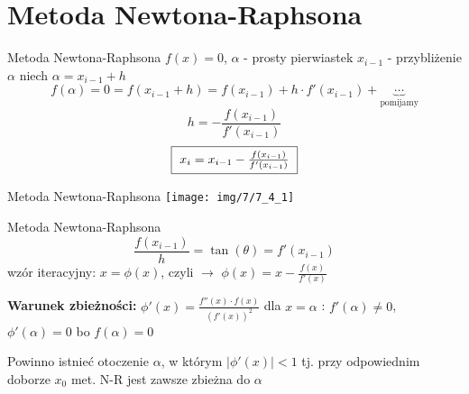 \section{Metoda Newtona-Raphsona}
\begin{frame}{Metoda Newtona-Raphsona}
	$f(x) = 0$, $\alpha$ - prosty pierwiastek\linebreak
	$x_{i-1}$ - przybliżenie $\alpha$\linebreak
	niech $\alpha = x_{i-1} + h$
	\[
		f(\alpha) = 0 = f(x_{i-1} + h) = f(x_{i-1}) + h \cdot f'(x_{i-1}) + \underbrace{\cdots}_{\text{pomijamy}}
	\]
	\[
		h = - \frac{f(x_{i-1})}{f'(x_{i-1})}
	\]
	\[
		\fbox{ $x_{i} = x_{i-1} - \frac{f(x_{i-1})}{f'(x_{i-1})}$ }
	\]
\end{frame}
\begin{frame}{Metoda Newtona-Raphsona}
	\centering
	\texttt{[image: img/7/7\_4\_1]}
\end{frame}
\begin{frame}{Metoda Newtona-Raphsona}
	\[
		\frac{f(x_{i-1})}{h} = \tan(\theta) = f'(x_{i-1})
	\]
	wzór iteracyjny:
	$x = \phi(x)$, czyli $\rightarrow$ $\phi(x) = x - \frac{f(x)}{f'(x)}$\linebreak
	
	\textbf{Warunek zbieżności: } $\phi'(x) = \frac{f''(x) \cdot f(x)}{(f'(x))^{2}}$ dla $x = \alpha$ : $f'(\alpha) \neq 0$, $\phi'(\alpha) = 0$ bo $f(\alpha) = 0$\linebreak
	
	Powinno istnieć otoczenie $\alpha$, w którym $\lvert \phi'(x) \rvert < 1$ tj. przy odpowiednim doborze $x_{0}$ met. N-R jest zawsze zbieżna do $\alpha$
\end{frame}

